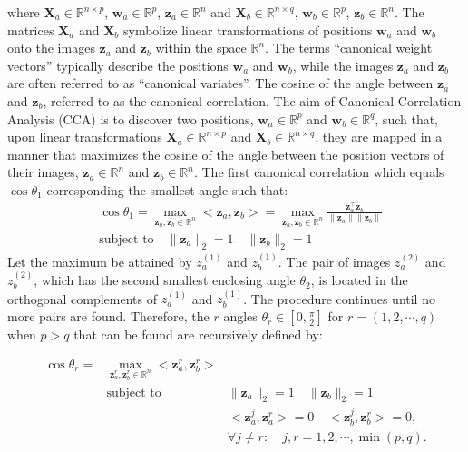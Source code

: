 where $\mathbf{X}_a\in \mathbb{R}^{n\times p}$, ${\mathbf w}_a\in\mathbb{R}^p$, ${\mathbf z}_a\in\mathbb{R}^n$  and $\mathbf{X}_b\in \mathbb{R}^{n\times q}$, $\mathbf{w}_b\in\mathbb{R}^p$, ${\mathbf z}_b\in\mathbb{R}^n$. The matrices $\mathbf{X}_a$ and $\mathbf{X}_b$ symbolize linear transformations of positions ${\mathbf w}_a$ and ${\mathbf w}_b$ onto the images ${\mathbf z}_a$ and ${\mathbf z}_b$ within the space $\mathbb{R}^n$. The terms ``canonical weight vectors'' typically describe the positions ${\mathbf w}_a$ and ${\mathbf w}_b$, while the images ${\mathbf z}_a$ and ${\mathbf z}_b$ are often referred to as ``canonical variates''. The cosine of the angle between ${\mathbf z}_a$ and ${\mathbf z}_b$, referred to as the canonical correlation. The aim of Canonical Correlation Analysis (CCA) is to discover two positions, $\mathbf{w}_a \in \mathbb{R}^p$ and $\mathbf{w}_b \in \mathbb{R}^q$, such that, upon linear transformations $\mathbf{X}_a \in \mathbb{R}^{n\times p}$ and $\mathbf{X}_b \in \mathbb{R}^{n\times q}$, they are mapped in a manner that maximizes the cosine of the angle between the position vectors of their images, $\mathbf{z}_a \in \mathbb{R}^n$ and $\mathbf{z}_b \in \mathbb{R}^n$. The first canonical correlation which equals $\cos\theta_1$ corresponding the smallest angle such that:
\begin{equation}
\begin{aligned}
&\cos \theta_1 = \underset{{\mathbf z}_a, {\mathbf z}_b \in\mathbb{R}^n}{\max}<{\mathbf z}_a, {\mathbf z}_b> 
			   = \underset{{\mathbf z}_a, {\mathbf z}_b \in\mathbb{R}^n}{\max}
			   		 \frac{\mathbf{z}_a^\top \mathbf{z}_b}{\|\mathbf{z}_a\| \|\mathbf{z}_b\|} \\
&\text{subject to}\quad \|{\mathbf z}_a\|_2=1\quad \|{\mathbf z}_b\|_2=1
\end{aligned}
\end{equation}
Let the maximum be attained by $z_{a}^{(1)}$ and $z_{b}^{(1)}$. The pair of images $z_{a}^{(2)}$ and $z_{b}^{(2)}$, which has the second smallest enclosing angle $\theta_2$, is located in the orthogonal complements of $z_{a}^{(1)}$ and $z_{b}^{(1)}$. The procedure continues until no more pairs are found. Therefore, the $r$ angles $\theta_r \in [0, \frac{\pi}{2}]$ for $r = (1,2,\cdots,q)$ when $p > q$ that can be found are recursively defined by:

\begin{equation}
\begin{aligned}
\cos \theta_r = &\underset{{\mathbf z}_a^r, {\mathbf z}_b^r \in\mathbb{R}^n}{\max}<{\mathbf z}_a^r, {\mathbf z}_b^r>\\ 					&\text{subject to  } & \|{\mathbf z}_a\|_2=1\quad \|{\mathbf z}_b\|_2=1\\
				  & & <{\mathbf z}_a^j, {\mathbf z}_a^r>=0\quad <{\mathbf z}_b^j, {\mathbf z}_b^r>=0,\\
				  & & \forall j \neq r: \quad j,r = 1,2,\cdots,\min(p,q).
\end{aligned}
\end{equation}

